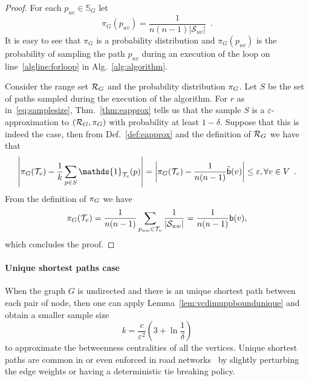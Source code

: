\begin{proof}
  For each $p_{uv}\in\mathbb{S}_G$ let
  \[
  \pi_G(p_{uv})=\frac{1}{n(n-1)|\mathcal{S}_{uv}|}\enspace.
  \]
  It is easy to see that $\pi_G$ is a probability distribution and
  $\pi_G(p_{uv})$ is the probability of sampling the path $p_{uv}$ during an
  execution of the loop on line~\ref{algline:forloop} in
  Alg.~\ref{alg:algorithm}.
  
  Consider the range set $\mathcal{R}_G$ and the probability distribution $\pi_G$.
  Let $S$ be the set of paths sampled during the execution of the algorithm.
  For $r$ as in~\eqref{eq:samplesize}, Thm.~\ref{thm:eapprox} tells us that the sample $S$ is a
  $\varepsilon$-approximation to $(\mathcal{R}_G,\pi_G)$ with probability at least
  $1-\delta$. Suppose that this is indeed the case, then from
  Def.~\ref{def:eapprox} and the definition of $\mathcal{R}_G$ we have that
  \[
  \left|\prob_G(\mathcal{T}_v) - \frac{1}{k}\sum_{p\in
  S}\mathds{1}_{\mathcal{T}_v}(p)\right|=\left|\prob_G(\mathcal{T}_v) -
  \frac{1}{n(n-1)}\tilde\betw(v)\right|\le\varepsilon, \forall v\in
  V\enspace.
  \]
  From the definition of $\pi_G$ we have
  \[
  \pi_G(\mathcal{T}_v)=\frac{1}{n(n-1)}\sum_{p_{uw}\in\mathcal{T}_v}\frac{1}{|\mathcal{S}_{uw}|}=\frac{1}{n(n-1)}\mathsf{b}(v),
  \]
  which concludes the proof.
\end{proof}

\paragraph{Unique shortest paths case} When the graph $G$ is undirected and
there is an unique shortest path between each pair of node, then one can apply
Lemma~\ref{lem:vcdimuppboundunique} and obtain a smaller sample size
\[ k= \frac{c}{\varepsilon^2}\left(3+\ln\frac{1}{\delta}\right)
\]
to approximate the betweenness centralities of all the vertices. Unique shortest
paths are common in or even enforced in road networks~\citep{GeisbergerSS08} by
slightly perturbing the edge weights or having a deterministic tie breaking
policy.

